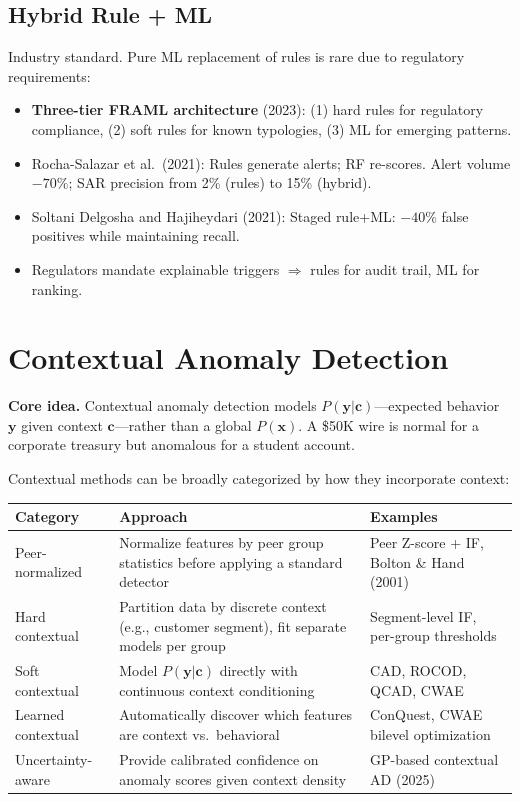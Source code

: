 \documentclass[11pt]{article}
\begin{document}
\subsection{Hybrid Rule + ML}

Industry standard. Pure ML replacement of rules is rare due to regulatory requirements:

\begin{itemize}
\item \textbf{Three-tier FRAML architecture} (2023): (1) hard rules for regulatory compliance, (2) soft rules for known typologies, (3) ML for emerging patterns.
\item Rocha-Salazar et al.\ (2021): Rules generate alerts; RF re-scores. Alert volume $-70\%$; SAR precision from 2\% (rules) to 15\% (hybrid).
\item Soltani Delgosha and Hajiheydari (2021): Staged rule+ML: $-40\%$ false positives while maintaining recall.
\item Regulators mandate explainable triggers $\Rightarrow$ rules for audit trail, ML for ranking.
\end{itemize}

\section{Contextual Anomaly Detection}

\textbf{Core idea.} Contextual anomaly detection models $P(\mathbf{y}|\mathbf{c})$---expected behavior $\mathbf{y}$ given context $\mathbf{c}$---rather than a global $P(\mathbf{x})$. A \$50K wire is normal for a corporate treasury but anomalous for a student account.

Contextual methods can be broadly categorized by how they incorporate context:

\begin{center}
\small
\begin{tabular}{p{3.2cm}p{4.5cm}p{4cm}}
\toprule
\textbf{Category} & \textbf{Approach} & \textbf{Examples} \\
\midrule
Peer-normalized & Normalize features by peer group statistics before applying a standard detector & Peer Z-score + IF, Bolton \& Hand (2001) \\
Hard contextual & Partition data by discrete context (e.g., customer segment), fit separate models per group & Segment-level IF, per-group thresholds \\
Soft contextual & Model $P(\mathbf{y}|\mathbf{c})$ directly with continuous context conditioning & CAD, ROCOD, QCAD, CWAE \\
Learned contextual & Automatically discover which features are context vs.\ behavioral & ConQuest, CWAE bilevel optimization \\
Uncertainty-aware & Provide calibrated confidence on anomaly scores given context density & GP-based contextual AD (2025) \\
\bottomrule
\end{tabular}
\end{center}
\end{document}
